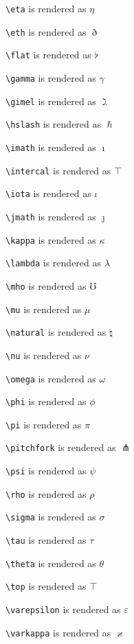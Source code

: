 \texttt{\textbackslash eta} is rendered as $\eta$


\texttt{\textbackslash eth} is rendered as $\eth$


\texttt{\textbackslash flat} is rendered as $\flat$


\texttt{\textbackslash gamma} is rendered as $\gamma$


\texttt{\textbackslash gimel} is rendered as $\gimel$


\texttt{\textbackslash hslash} is rendered as $\hslash$


\texttt{\textbackslash imath} is rendered as $\imath$


\texttt{\textbackslash intercal} is rendered as $\intercal$


\texttt{\textbackslash iota} is rendered as $\iota$


\texttt{\textbackslash jmath} is rendered as $\jmath$


\texttt{\textbackslash kappa} is rendered as $\kappa$


\texttt{\textbackslash lambda} is rendered as $\lambda$


\texttt{\textbackslash mho} is rendered as $\mho$


\texttt{\textbackslash mu} is rendered as $\mu$


\texttt{\textbackslash natural} is rendered as $\natural$


\texttt{\textbackslash nu} is rendered as $\nu$


\texttt{\textbackslash omega} is rendered as $\omega$


\texttt{\textbackslash phi} is rendered as $\phi$


\texttt{\textbackslash pi} is rendered as $\pi$


\texttt{\textbackslash pitchfork} is rendered as $\pitchfork$


\texttt{\textbackslash psi} is rendered as $\psi$


\texttt{\textbackslash rho} is rendered as $\rho$


\texttt{\textbackslash sigma} is rendered as $\sigma$


\texttt{\textbackslash tau} is rendered as $\tau$


\texttt{\textbackslash theta} is rendered as $\theta$


\texttt{\textbackslash top} is rendered as $\top$


\texttt{\textbackslash varepsilon} is rendered as $\varepsilon$


\texttt{\textbackslash varkappa} is rendered as $\varkappa$


